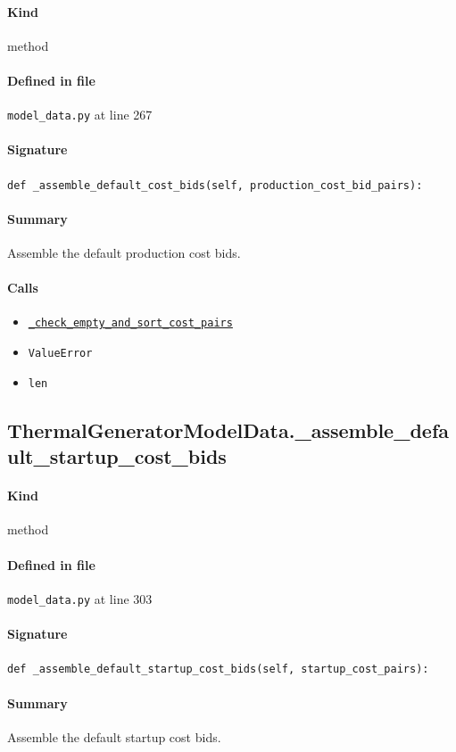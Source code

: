 \documentclass[11pt]{report}
\begin{document}
\paragraph{Kind} method
\paragraph{Defined in file} \texttt{model\_data.py} at line 267
\paragraph{Signature} \texttt{def \_assemble\_default\_cost\_bids(self, production\_cost\_bid\_pairs):}
\paragraph{Summary} Assemble the default production cost bids.
\paragraph{Calls}
\begin{itemize}[leftmargin=*]
  \item \hyperref[def:model_data.py:ThermalGeneratorModelData._check_empty_and_sort_cost_pairs:L245]{\texttt{\_check\_empty\_and\_sort\_cost\_pairs}}
  \item \texttt{ValueError}
  \item \texttt{len}
\end{itemize}
\subsection{ThermalGeneratorModelData.\_assemble\_default\_startup\_cost\_bids}
\label{def:model_data.py:ThermalGeneratorModelData._assemble_default_startup_cost_bids:L303}
\paragraph{Kind} method
\paragraph{Defined in file} \texttt{model\_data.py} at line 303
\paragraph{Signature} \texttt{def \_assemble\_default\_startup\_cost\_bids(self, startup\_cost\_pairs):}
\paragraph{Summary} Assemble the default startup cost bids.
\end{document}
